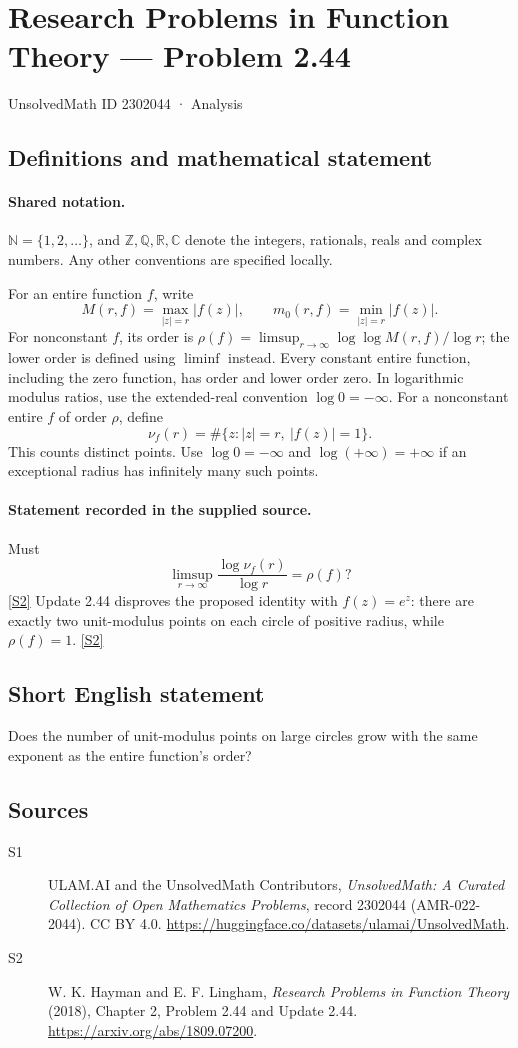 \documentclass[11pt]{article}
\newcommand{\sref}[2]{\hyperlink{source:#1:#2}{[S#2]}}
\begin{document}
\setcounter{section}{2302043}
\section{Research Problems in Function Theory — Problem 2.44}\label{2302044}
{\small\sffamily UnsolvedMath ID 2302044 · Analysis}
\subsection{Definitions and mathematical statement}

\paragraph{Shared notation.}$\mathbb N=\{1,2,\ldots\}$, and $\mathbb Z,\mathbb Q,\mathbb R,\mathbb C$ denote the integers, rationals, reals and complex numbers. Any other conventions are specified locally.


For an entire function $f$, write
\[
 M(r,f)=\max_{|z|=r}|f(z)|,\qquad m_0(r,f)=\min_{|z|=r}|f(z)|.
\]
For nonconstant $f$, its order is $\rho(f)=\limsup_{r\to\infty}\log\log M(r,f)/\log r$;
the lower order is defined using $\liminf$ instead. Every constant entire function, including the zero function, has order and lower order zero. In logarithmic modulus ratios, use the extended-real convention $\log0=-\infty$.
For a nonconstant entire $f$ of order $\rho$, define
\[\nu_f(r)=\#\{z:|z|=r,\ |f(z)|=1\}.\]
This counts distinct points. Use $\log0=-\infty$ and $\log(+\infty)=+\infty$ if an exceptional radius has infinitely many such points.

\paragraph{Statement recorded in the supplied source.}
Must
\[\limsup_{r\to\infty}\frac{\log\nu_f(r)}{\log r}=\rho(f)?\] \sref{2302044}{2}
Update 2.44 disproves the proposed identity with $f(z)=e^z$: there are exactly two unit-modulus points on each circle of positive radius, while $\rho(f)=1$. \sref{2302044}{2}
\subsection{Short English statement}
Does the number of unit-modulus points on large circles grow with the same exponent as the entire function's order?
\subsection{Sources}
\begin{description}
\item[\hypertarget{source:2302044:1}{S1}] ULAM.AI and the UnsolvedMath Contributors, \emph{UnsolvedMath: A Curated Collection of Open Mathematics Problems}, record 2302044 (AMR-022-2044). CC BY 4.0. \url{https://huggingface.co/datasets/ulamai/UnsolvedMath}.
\item[\hypertarget{source:2302044:2}{S2}] W. K. Hayman and E. F. Lingham, \emph{Research Problems in Function Theory} (2018), Chapter 2, Problem 2.44 and Update 2.44. \url{https://arxiv.org/abs/1809.07200}.
\end{description}
\label{end:2302044}
\end{document}
